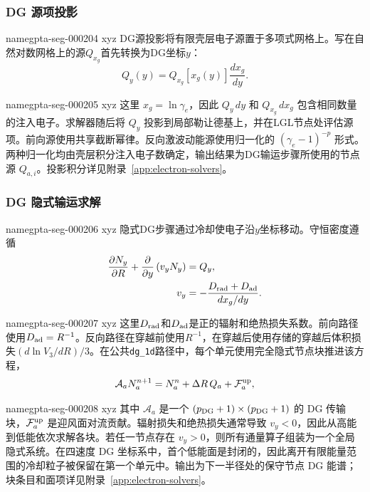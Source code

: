 \documentclass[twocolumn]{aastex702}
\makeatletter
\providecommand{\gptareaderanchor}[1]{\pdfdest name{#1} xyz}%
\providecommand{\gptareaderanchor}[1]{\special{pdf:dest (#1) [ @thispage /XYZ @xpos @ypos null ]}}%
\makeatother
\begin{document}
\subsubsection{DG 源项投影}


\gptareaderanchor{gpta-seg-000204}%
DG源投影将有限壳层电子源置于多项式网格上。写在自然对数网格上的源\(Q_{x_g}\)首先转换为DG坐标\(y\)：
\begin{equation}
Q_y(y)=Q_{x_g}[x_g(y)]\frac{dx_g}{dy}.
\end{equation}

\gptareaderanchor{gpta-seg-000205}%
这里 \(x_g=\ln\gamma_e\)，因此 \(Q_y\,dy\) 和 \(Q_{x_g}\,dx_g\) 包含相同数量的注入电子。求解器随后将 \(Q_y\) 投影到局部勒让德基上，并在LGL节点处评估源项。前向源使用共享截断幂律。反向激波动能源使用归一化的 \((\gamma_e-1)^{-p}\) 形式。两种归一化均由壳层积分注入电子数确定，输出结果为DG输运步骤所使用的节点源 \(Q_{a,i}\)。投影积分详见附录~\ref{app:electron-solvers}。

\subsubsection{DG 隐式输运求解}


\gptareaderanchor{gpta-seg-000206}%
隐式DG步骤通过冷却使电子沿\(y\)坐标移动。守恒密度遵循
\begin{equation}
\begin{aligned}
\frac{\partial N_y}{\partial R}
+\frac{\partial}{\partial y}\left(v_yN_y\right)&=Q_y,\\
v_y&=-\frac{D_{\rm rad}+D_{\rm ad}}
{dx_g/dy}.
\end{aligned}
\end{equation}

\gptareaderanchor{gpta-seg-000207}%
这里\(D_{\rm rad}\)和\(D_{\rm ad}\)是正的辐射和绝热损失系数。前向路径使用\(D_{\rm ad}=R^{-1}\)。反向路径在穿越前使用\(R^{-1}\)，在穿越后使用存储的穿越后体积损失\((d\ln V_3/dR)/3\)。在公共\texttt{dg\_1d}路径中，每个单元使用完全隐式节点块推进该方程，
\begin{equation}
\mathcal A_a N_a^{n+1}
=N_a^n+\Delta R\,Q_a+\mathcal F_a^{\rm up},
\end{equation}

\gptareaderanchor{gpta-seg-000208}%
其中 \(\mathcal A_a\) 是一个 \((p_{\rm DG}+1)\times(p_{\rm DG}+1)\) 的 DG 传输块，\(\mathcal F_a^{\rm up}\) 是迎风面对流贡献。辐射损失和绝热损失通常导致 \(v_y<0\)，因此从高能到低能依次求解各块。若任一节点存在 \(v_y>0\)，则所有通量算子组装为一个全局隐式系统。在四速度 DG 坐标系中，首个低能面是封闭的，因此离开有限能量范围的冷却粒子被保留在第一个单元中。输出为下一半径处的保守节点 DG 能谱；块条目和面项详见附录~\ref{app:electron-solvers}。
\end{document}
